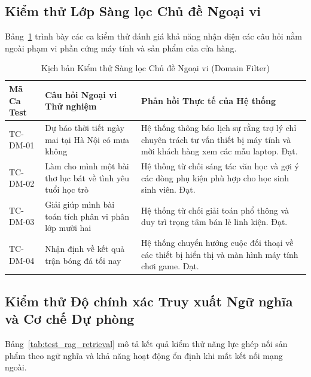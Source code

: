 \subsection{Kiểm thử Lớp Sàng lọc Chủ đề Ngoại vi}
Bảng~\ref{tab:test_rag_domain} trình bày các ca kiểm thử đánh giá khả năng nhận diện các câu hỏi nằm ngoài phạm vi phần cứng máy tính và sản phẩm của cửa hàng.

\begin{table}[H]
\centering
\caption{Kịch bản Kiểm thử Sàng lọc Chủ đề Ngoại vi (Domain Filter)}
\label{tab:test_rag_domain}
\begin{tabularx}{\textwidth}{p{2.2cm}p{5.5cm}X}
\toprule
\textbf{Mã Ca Test} & \textbf{Câu hỏi Ngoại vi Thử nghiệm} & \textbf{Phản hồi Thực tế của Hệ thống} \\
\midrule
TC-DM-01 & Dự báo thời tiết ngày mai tại Hà Nội có mưa không & Hệ thống thông báo lịch sự rằng trợ lý chỉ chuyên trách tư vấn thiết bị máy tính và mời khách hàng xem các mẫu laptop. Đạt. \\
\addlinespace
TC-DM-02 & Làm cho mình một bài thơ lục bát về tình yêu tuổi học trò & Hệ thống từ chối sáng tác văn học và gợi ý các dòng phụ kiện phù hợp cho học sinh sinh viên. Đạt. \\
\addlinespace
TC-DM-03 & Giải giúp mình bài toán tích phân vi phân lớp mười hai & Hệ thống từ chối giải toán phổ thông và duy trì trọng tâm bán lẻ linh kiện. Đạt. \\
\addlinespace
TC-DM-04 & Nhận định về kết quả trận bóng đá tối nay & Hệ thống chuyển hướng cuộc đối thoại về các thiết bị hiển thị và màn hình máy tính chơi game. Đạt. \\
\bottomrule
\end{tabularx}
\end{table}

\subsection{Kiểm thử Độ chính xác Truy xuất Ngữ nghĩa và Cơ chế Dự phòng}
Bảng~\ref{tab:test_rag_retrieval} mô tả kết quả kiểm thử năng lực ghép nối sản phẩm theo ngữ nghĩa và khả năng hoạt động ổn định khi mất kết nối mạng ngoài.

